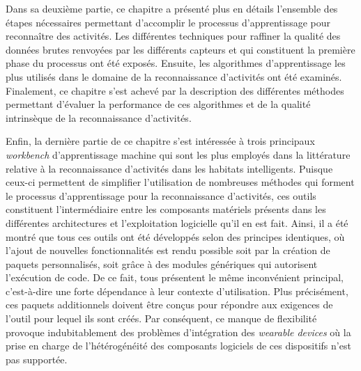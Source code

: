 Dans sa deuxième partie, ce chapitre a présenté plus en détails l'ensemble des étapes nécessaires permettant d'accomplir le processus d'apprentissage pour reconnaître des activités. Les différentes techniques pour raffiner la qualité des données brutes renvoyées par les différents capteurs et qui constituent la première phase du processus ont été exposés. Ensuite, les algorithmes d'apprentissage les plus utilisés dans le domaine de la reconnaissance d'activités ont été examinés. Finalement, ce chapitre s'est achevé par la description des différentes méthodes permettant d'évaluer la performance de ces algorithmes et de la qualité intrinsèque de la reconnaissance d'activités.

Enfin, la dernière partie de ce chapitre s'est intéressée à trois principaux \textit{workbench} d'apprentissage machine qui sont les plus employés dans la littérature relative à la reconnaissance d'activités dans les habitats intelligents. Puisque ceux-ci permettent de simplifier l'utilisation de nombreuses méthodes qui forment le processus d'apprentissage pour la reconnaissance d'activités, ces outils constituent l'intermédiaire entre les composants matériels présents dans les différentes architectures et l'exploitation logicielle qu'il en est fait. Ainsi, il a été montré que tous ces outils ont été développés selon des principes identiques, où l'ajout de nouvelles fonctionnalités est rendu possible soit par la création de paquets personnalisés, soit grâce à des modules génériques qui autorisent l'exécution de code. De ce fait, tous présentent le même inconvénient principal, c'est-à-dire une forte dépendance à leur contexte d'utilisation. Plus précisément, ces paquets additionnels doivent être conçus pour répondre aux exigences de l'outil pour lequel ils sont créés. Par conséquent, ce manque de flexibilité provoque indubitablement des problèmes d'intégration des \textit{wearable devices} où la prise en charge de l'hétérogénéité des composants logiciels de ces dispositifs n'est pas supportée.
